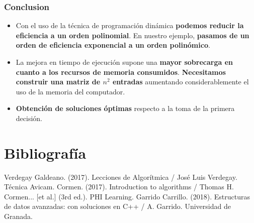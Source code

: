 \documentclass[13pt]{beamer}
\begin{document}
    \begin{frame}
		\frametitle{Conclusion}
        \begin{itemize}
            
            \item Con el uso de la técnica de programación dinámica \textbf{podemos reducir la eficiencia a un orden polinomial}. En nuestro ejemplo, \textbf{pasamos de un orden de eficiencia exponencial
            a un orden polinómico}.
            
            \item La mejora en tiempo de ejecución supone una \textbf{mayor sobrecarga en cuanto a los recursos de memoria consumidos}.  \textbf{Necesitamos construir una matriz de $n^{2}$ 
            entradas} aumentando considerablemente el uso de la memoria del computador.

            \item \textbf{Obtención de soluciones óptimas} respecto a la toma de la primera decisión.
            
            
        \end{itemize}
	\end{frame}


    \section{Bibliografía}

    \begin{frame}
        \begin{thebibliography}{0}
             Verdegay Galdeano. (2017). Lecciones de Algorítmica / José Luis Verdegay. Técnica Avicam.
             Cormen. (2017). Introduction to algorithms / Thomas H. Cormen... [et al.] (3rd ed.). PHI Learning.
             Garrido Carrillo. (2018). Estructuras de datos avanzadas: con soluciones en C++ / A. Garrido. Universidad de Granada.  
        \end{thebibliography}
    \end{frame}
\end{document}
